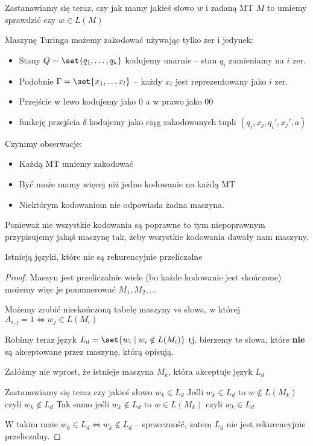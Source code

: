 Zastanawiamy się teraz, czy jak mamy jakieś słowo \( w \) i zadaną MT \( M \) to umiemy sprawdzić czy \( w \in L(M) \)

Maszynę Turinga możemy zakodować używając tylko zer i jedynek:
\begin{itemize}
	\item Stany \( Q = \set{q_1, \dots, q_k} \) kodujemy unarnie -- stan \( q_i \) zamieniamy na \( i \) zer.

	\item Podobnie \( \Gamma = \set{x_1, \dots x_l} \) -- każdy \( x_i \) jest reprezentowany jako \( i \) zer.

	\item Przejście w lewo kodujemy jako \(0\) a w prawo jako \(00\)

	\item funkcję przejścia \( \delta \) kodujemy jako ciąg zakodowanych tupli \( (q_i, x_j, q_i', x_j', a) \)
\end{itemize}

Czynimy obserwacje:
\begin{itemize}
	\item Każdą MT umiemy zakodować
	\item Być może mamy więcej niż jedno kodowanie na każdą MT
	\item Niektórym kodowaniom nie odpowiada żadna maszyna.
\end{itemize}

Ponieważ nie wszystkie kodowania są poprawne to tym niepoprawnym przypisujemy jakąś maszynę tak, żeby wszystkie kodowania dawały nam maszyny.

\begin{lemma}
	Istnieją języki, które nie są rekurencyjnie przeliczalne
\end{lemma}

\begin{proof}
	Maszyn jest przeliczalnie wiele (bo każde kodowanie jest skończone) możemy więc je ponumerować \( M_1, M_2, \dots \)

	Możemy zrobić nieskończoną tabelę maszyny vs słowa, w której \( A_{i, j} = 1 \iff w_j \in L(M_i) \)

	Robimy teraz język \( L_d = \set{w_i \mid w_i \notin L(M_i)} \) tj. bierzemy te słowa, które \textbf{nie} są akceptowane przez maszynę, którą opisują.

	Załóżmy nie wprost, że istnieje maszyna \( M_k \), która akceptuje język \( L_d \)

	Zastanawiamy się teraz czy jakieś słowo \( w_k \in L_d \)
	Jeśli \( w_k \in L_d \) to \( w \notin L(M_k) \) czyli \( w_k \notin L_d \)
	Tak samo jeśli \( w_k \notin L_d \) to \( w \in L(M_k) \) czyli \( w_k \in L_d \)

	W takim razie \( w_k \in L_d \iff w_k \notin L_d \) -- sprzeczność, zatem \( L_d \) nie jest rekurencyjnie przeliczalny.
\end{proof}



